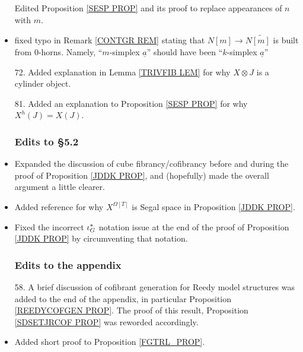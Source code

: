 \documentclass{article}
\begin{document}
\begin{itemize}
Edited Proposition \ref{SESP PROP} and its proof to replace appearances of $n$ with $m$. %

\item fixed typo in Remark \ref{CONTGR REM} stating that $N[m] \to N \widetilde{[m]}$ is built from $0$-horns. Namely, ``$m$-simplex $\underline{a}$'' should have been ``$k$-simplex $\underline{a}$'' %

\item[72.] Added explanation in Lemma \ref{TRIVFIB LEM} for why $X \otimes J$ is a cylinder object. %

\item[81.] Added an explanation to Proposition \ref{SESP PROP} for why $X^h(J) = X(J)$. %
      

      
      
      \subsubsection*{Edits to \S 5.2}
\item Expanded the discussion of cube fibrancy/cofibrancy before and during the proof of Proposition \ref{JDDK PROP}, and (hopefully) made the overall argument a little clearer. %
      
\item Added reference for why $X^{\Omega[T]}$ is Segal space in Proposition \ref{JDDK PROP}. %

\item Fixed the incorrect $\iota^{\**}_G$ notation issue at the end of the proof of Proposition \ref{JDDK PROP} by circumventing that notation. %



      
      \subsubsection*{Edits to the appendix}
\item[58.] A brief discussion of cofibrant generation for Reedy model structures was added to the end of the appendix, in particular Proposition \ref{REEDYCOFGEN PROP}. The proof of this result, Proposition \ref{SDSETJRCOF PROP} was reworded accordingly. %
      
\item Added short proof to Proposition \ref{FGTRL_PROP}. %


      


\end{itemize}
\end{document}
